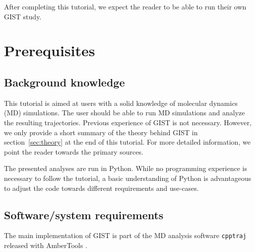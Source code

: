 \documentclass[9pt,tutorial]{livecoms}
\newcommand{\software}{\texttt}
\begin{document}
After completing this tutorial, we expect the reader to be able to run their own GIST study. 

%

\section{Prerequisites}


\subsection{Background knowledge}
This tutorial is aimed at users with a solid knowledge of molecular dynamics (MD) simulations.
The user should be able to run MD simulations and analyze the resulting trajectories.
Previous experience of GIST is not necessary.
However, we only provide a short summary of the theory behind GIST in section~\ref{sec:theory} at the end of this tutorial.
For more detailed information, we point the reader towards the primary sources.

The presented analyses are run in Python.
While no programming experience is necessary to follow the tutorial, a basic understanding of Python is advantageous to adjust the code towards different requirements and use-cases.

\subsection{Software/system requirements}
The main implementation of GIST is part of the MD analysis software \software{cpptraj} released with AmberTools \cite{amber22}.
\end{document}
